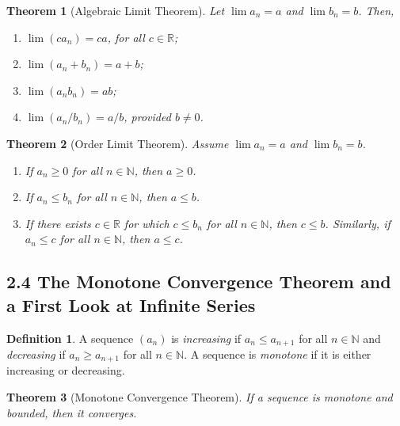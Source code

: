 \documentclass[11pt]{amsart}
\newtheorem*{theorem}{Theorem}
\theoremstyle{definition}
\newtheorem*{definition}{Definition}
\newcommand{\N}{\mathbb{N}}
\newcommand{\R}{\mathbb{R}}
\begin{document}
\begin{theorem}[Algebraic Limit Theorem]
  Let $\lim{a_n} = a$ and $\lim{b_n} = b$. Then,
  \begin{enumerate}[label={(\roman*)}]
    \item $\lim(ca_n) = ca$, for all $c \in \R$;
    \item $\lim(a_n + b_n) = a + b$;
    \item $\lim(a_n b_n) = ab$;
    \item $\lim(a_n / b_n) = a / b$, provided $b \neq 0$.
  \end{enumerate}
\end{theorem}

\begin{theorem}[Order Limit Theorem]
  Assume $\lim{a_n} = a$ and $\lim{b_n} = b$.
  \begin{enumerate}[label={(\roman*)}]
    \item If $a_n \ge 0$ for all $n \in \N$, then $a \ge 0$.
    \item If $a_n \le b_n$ for all $n \in \N$, then $a \le b$.
    \item If there exists $c \in \R$ for which $c \le b_n$ for all $n \in \N$,
      then $c \le b$. Similarly, if $a_n \le c$ for all $n \in \N$, then $a \le
      c$.
  \end{enumerate}
\end{theorem}

\subsection*{2.4 The Monotone Convergence Theorem and a First Look at Infinite
Series}

\begin{definition}
  A sequence $(a_n)$ is \emph{increasing} if $a_n \le a_{n+1}$ for all $n \in
  \N$ and \emph{decreasing} if $a_n \ge a_{n+1}$ for all $n \in \N$. A sequence
  is \emph{monotone} if it is either increasing or decreasing.
\end{definition}

\begin{theorem}[Monotone Convergence Theorem]
  If a sequence is monotone and bounded, then it converges.
\end{theorem}
\end{document}
